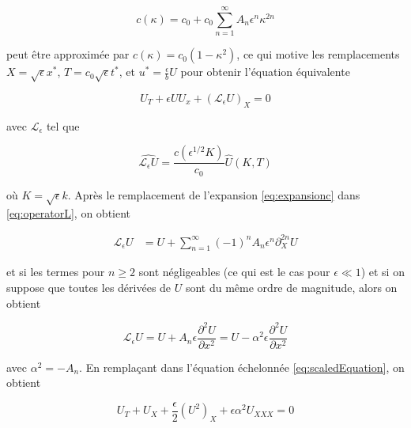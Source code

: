 \begin{equation}
\label{eq:expansionc}
c(\kappa) = c_0 + c_0 \sum_{n=1}^{\infty}A_n\epsilon^n\kappa^{2n}
\end{equation}

\noindent peut être approximée par  $c(\kappa) = c_0(1-\kappa^2)$, ce qui motive les remplacements $ X=\sqrt{\epsilon}x^*$, $T =c_0 \sqrt{\epsilon} t^*$, et $u^* = \frac{\epsilon}{ b} U$ pour obtenir l'équation équivalente   





\begin{equation}
\label{eq:scaledEquation}
 U_T + \epsilon U U_x+(\mathcal{L}_{\epsilon} U)_{X} = 0
 \end{equation}

\noindent avec $\mathcal{L}_\epsilon$ tel que 

\begin{equation}
\label{eq:operatorL}
\widehat{\mathcal{L}_\epsilon U} = \frac{c(\epsilon^{1/2} K)}{c_0} \hat{U}(K,T)
\end{equation}

\noindent où $K=\sqrt{\epsilon} k$. Après le remplacement de l'expansion \eqref{eq:expansionc} dans \eqref{eq:operatorL}, on obtient

\begin{align}
  \label{eq:expansionLe}
    \mathcal{L}_\epsilon U &=U +\sum_{n=1}^\infty (-1)^n A_n \epsilon^n \partial_X^{2n} U    
\end{align}

\noindent et si les termes pour $n\geq2$ sont négligeables (ce qui est le cas pour $\epsilon \ll 1 $) et si on suppose que toutes les dérivées de $U$ sont du même ordre de magnitude, alors on obtient

\begin{equation*}
    \mathcal{L}_\epsilon U = U + A_n \epsilon \frac{\partial^2 U}{\partial x^2} = U - \alpha^2 \epsilon \frac{\partial^2 U}{\partial x^2}
\end{equation*}

\noindent avec $\alpha^2 = - A_n$. En remplaçant dans l'équation échelonnée \eqref{eq:scaledEquation}, on obtient

$$U_T + U_X + \frac{\epsilon}{2} (U^2)_X + \epsilon\alpha^2U_{XXX} = 0$$

